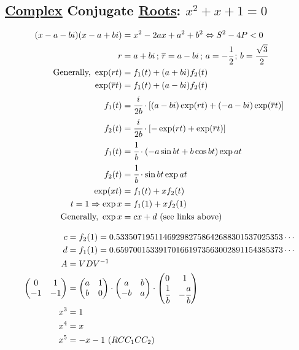 \documentclass[12pt,a4paper]{article}
\begin{document}
\subsection{\href{https://www.wolframalpha.com/input/?i=e\%5E(-1\%2F2+\%2B+i*sqrt(3)\%2F2)+-+0.533507195114692982758642688301537025353+*+(-1\%2F2+\%2B+i*sqrt(3)\%2F2)+-+0.659700153391701661973563002891154385373}{\color{blue}\underline{Complex}} Conjugate \href{https://www.wolframalpha.com/input/?i=e\%5E(-1\%2F2+-+i*sqrt(3)\%2F2)+-+0.533507195114692982758642688301537025353+*+(-1\%2F2+-+i*sqrt(3)\%2F2)+-+0.659700153391701661973563002891154385373}{\color{blue}\underline{Roots}}: $x^2 + x + 1 = 0$}

\begin{align}
(x - a - bi)(x - a + bi) &= x^2 - 2ax + a^2 + b^2 \Leftrightarrow S^2 - 4P < 0 \\
r &= a + bi\,;\,\overline{r} = a - bi\,;\,a = -\cfrac{1}{2}\,;\,b = \cfrac{\sqrt{3}}{2} \\
\text{Generally, } \exp (r t) &= f_1(t) + (a + bi) f_2(t) \\
\exp (\overline{r} t) &= f_1(t) + (a - bi) f_2(t) \\
f_1(t) &= \cfrac{i}{2b} \cdot [(a - bi) \exp (rt) + (-a - bi) \exp(\overline{r}t)] \\
f_2(t) &= \cfrac{i}{2b} \cdot [- \exp (rt) + \exp(\overline{r}t)] \\
f_1(t) &= \cfrac{1}{b} \cdot (-a \sin bt + b \cos bt) \exp at \\
f_2(t) &= \cfrac{1}{b} \cdot \sin bt \exp at \\
\exp (xt) &= f_1(t) + x f_2(t) \\
t = 1 \Rightarrow \exp x &= f_1(1) + x f_2(1) \\
\text{Generally, } \exp x &= cx + d \text{ (see links above)}
\end{align}

\begin{align}
c &= f_2(1) = 0.533507195114692982758642688301537025353\cdots \\
d &= f_1(1) = 0.659700153391701661973563002891154385373\cdots \\
A &= VDV^{-1} \\
\left( \begin{matrix} 0 & 1 \\ -1 & -1 \end{matrix} \right) &= \left( \begin{matrix} a & 1 \\  b & 0 \end{matrix} \right) \cdot \left( \begin{matrix} a & b \\ -b & a \end{matrix} \right) \cdot \left( \begin{matrix} 0 & 1 \\ \cfrac{1}{b} & -\cfrac{a}{b} \end{matrix} \right) \\
x^3 &= 1 \\
x^4 &= x \\
x^5 &= - x - 1\,\,(RCC_1CC_2)
\end{align}
\end{document}
